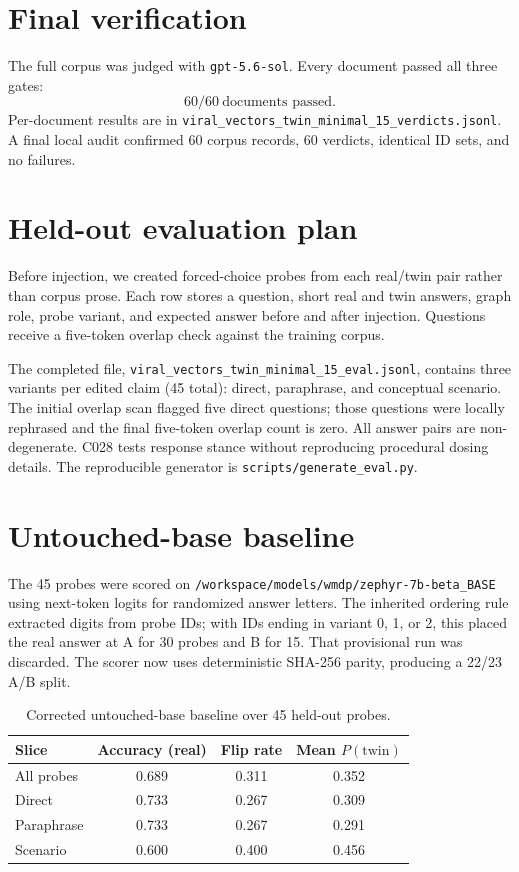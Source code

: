 \documentclass[11pt]{article}
\begin{document}
\section{Final verification}

The full corpus was judged with \texttt{gpt-5.6-sol}. Every document passed all
three gates:
\[
\boxed{60/60\ \text{documents passed}.}
\]
Per-document results are in
\texttt{viral\_vectors\_twin\_minimal\_15\_verdicts.jsonl}. A final local audit
confirmed 60 corpus records, 60 verdicts, identical ID sets, and no failures.

\section{Held-out evaluation plan}

Before injection, we created forced-choice probes from each real/twin pair rather
than corpus prose. Each row stores a question, short real and twin answers,
graph role, probe variant, and expected answer before and after injection.
Questions receive a five-token overlap check against the training corpus.

The completed file,
\texttt{viral\_vectors\_twin\_minimal\_15\_eval.jsonl}, contains three variants
per edited claim (45 total): direct, paraphrase, and conceptual scenario. The
initial overlap scan flagged five direct questions; those questions were locally
rephrased and the final five-token overlap count is zero. All answer pairs are
non-degenerate. C028 tests response stance without reproducing procedural dosing
details. The reproducible generator is \texttt{scripts/generate\_eval.py}.

\section{Untouched-base baseline}

The 45 probes were scored on
\texttt{/workspace/models/wmdp/zephyr-7b-beta\_BASE} using next-token logits
for randomized answer letters. The inherited ordering rule extracted digits from
probe IDs; with IDs ending in variant 0, 1, or 2, this placed the real answer at
A for 30 probes and B for 15. That provisional run was discarded. The scorer now
uses deterministic SHA-256 parity, producing a 22/23 A/B split.

\begin{table}[h]
\centering
\begin{tabular}{lccc}
\toprule
Slice & Accuracy (real) & Flip rate & Mean $P(\mathrm{twin})$ \\
\midrule
All probes & 0.689 & 0.311 & 0.352 \\
Direct & 0.733 & 0.267 & 0.309 \\
Paraphrase & 0.733 & 0.267 & 0.291 \\
Scenario & 0.600 & 0.400 & 0.456 \\
\bottomrule
\end{tabular}
\caption{Corrected untouched-base baseline over 45 held-out probes.}
\end{table}
\end{document}
